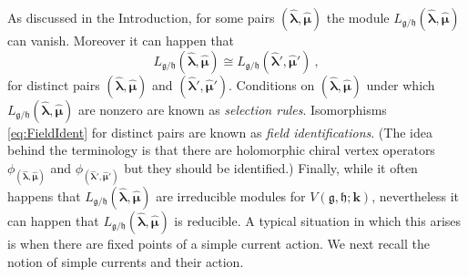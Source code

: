 \documentclass[a4paper,11pt]{article}
\newcommand{\bk}{\bm{k}}
\newcommand{\hblm}{\hat{\bm{\lambda}}}
\newcommand{\hbmu}{\hat{\bm{\mu}}}
\def\fg{\mathfrak{g}}
\def\fh{\mathfrak{h}}
\begin{document}
As discussed in the Introduction, for some pairs $(\hblm,\hbmu)$ 
the module $L_{\fg/\fh}(\hblm,\hbmu)$ can vanish. Moreover it can happen that 
%
\begin{equation}\label{eq:FieldIdent}
L_{\fg/\fh}(\hblm,\hbmu)\cong L_{\fg/\fh}(\hblm',\hbmu')~,
\end{equation}
%
for distinct pairs $(\hblm,\hbmu)$ and $(\hblm',\hbmu')$. 
Conditions on $(\hblm,\hbmu)$ under which  $L_{\fg/\fh}(\hblm,\hbmu)$ are nonzero are known as 
\textit{selection rules}. Isomorphisms \eqref{eq:FieldIdent} for distinct pairs are known 
as \textit{field identifications}. (The idea behind the terminology is that there are holomorphic chiral vertex operators $\phi_{(\hblm,\hbmu)}$ and $\phi_{(\hblm',\hbmu')}$ but they should be identified.) Finally, while it often happens that $L_{\fg/\fh}(\hblm,\hbmu)$ are irreducible modules for $V(\fg,\fh;\bk)$, nevertheless it can happen  
that $L_{\fg/\fh}(\hblm,\hbmu)$ is reducible. A typical situation in which this arises is when 
there are fixed points of a simple current action. We next recall the notion of simple currents 
and their action. 
\end{document}
